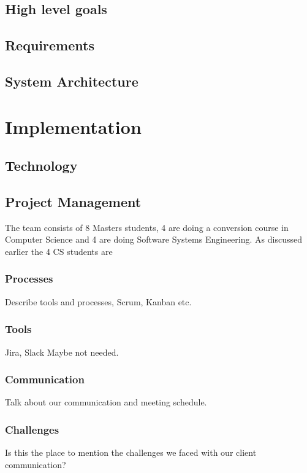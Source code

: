 \documentclass[prodmode,acmtecs]{acmsmall} %
\begin{document}
\subsection{High level goals}


\subsection{Requirements}

\subsection{System Architecture}

\section{Implementation}


\subsection{Technology}

\subsection{Project Management}
The team consists of 8 Masters students, 4 are doing a conversion course in Computer Science and 4 are doing Software Systems Engineering. As discussed earlier the 4 CS students are 
\subsubsection{Processes}
Describe tools and processes, Scrum, Kanban etc.


\subsubsection{Tools}
Jira, Slack Maybe not needed.

\subsubsection{Communication}
Talk about our communication and meeting schedule.

\subsubsection{Challenges}
Is this the place to mention the challenges we faced with our client communication? 
\end{document}
